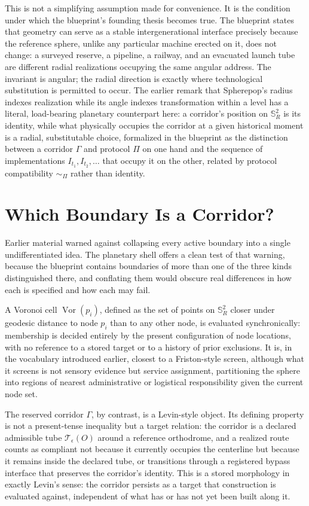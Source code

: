 \documentclass[11pt,fleqn]{book}
\numberwithin{equation}{chapter}
\theoremstyle{plain}
\theoremstyle{definition}
\theoremstyle{remark}
\newcommand{\Sphere}{\mathbb{S}^{2}}
\newcommand{\Vor}{\operatorname{Vor}}
\providecommand{\Tset}{\mathcal{T}}
\begin{document}
This is not a simplifying assumption made for convenience. It is the condition under which the blueprint's founding thesis becomes true. The blueprint states that geometry can serve as a stable intergenerational interface precisely because the reference sphere, unlike any particular machine erected on it, does not change: a surveyed reserve, a pipeline, a railway, and an evacuated launch tube are different radial realizations occupying the same angular address. The invariant is angular; the radial direction is exactly where technological substitution is permitted to occur. The earlier remark that Spherepop's radius indexes realization while its angle indexes transformation within a level has a literal, load-bearing planetary counterpart here: a corridor's position on \(\Sphere_R\) is its identity, while what physically occupies the corridor at a given historical moment is a radial, substitutable choice, formalized in the blueprint as the distinction between a corridor \(\Gamma\) and protocol \(\Pi\) on one hand and the sequence of implementations \(I_{t_1}, I_{t_2}, \ldots\) that occupy it on the other, related by protocol compatibility \(\sim_\Pi\) rather than identity.

\section{Which Boundary Is a Corridor?}

Earlier material warned against collapsing every active boundary into a single undifferentiated idea. The planetary shell offers a clean test of that warning, because the blueprint contains boundaries of more than one of the three kinds distinguished there, and conflating them would obscure real differences in how each is specified and how each may fail.

A Voronoi cell \(\Vor(p_i)\), defined as the set of points on \(\Sphere_R\) closer under geodesic distance to node \(p_i\) than to any other node, is evaluated synchronically: membership is decided entirely by the present configuration of node locations, with no reference to a stored target or to a history of prior exclusions. It is, in the vocabulary introduced earlier, closest to a Friston-style screen, although what it screens is not sensory evidence but service assignment, partitioning the sphere into regions of nearest administrative or logistical responsibility given the current node set.

The reserved corridor \(\Gamma\), by contrast, is a Levin-style object. Its defining property is not a present-tense inequality but a target relation: the corridor is a declared admissible tube \(\Tset_\epsilon(O)\) around a reference orthodrome, and a realized route counts as compliant not because it currently occupies the centerline but because it remains inside the declared tube, or transitions through a registered bypass interface that preserves the corridor's identity. This is a stored morphology in exactly Levin's sense: the corridor persists as a target that construction is evaluated against, independent of what has or has not yet been built along it.
\end{document}
